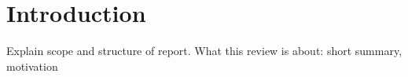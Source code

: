 \section{Introduction}
\label{s:Introduction}

Explain scope and structure of report. What this review is about:
short summary, motivation
